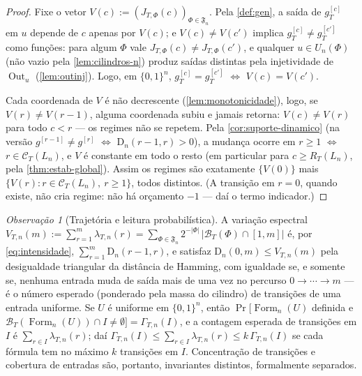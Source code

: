 \documentclass[11pt,a4paper]{article}
\theoremstyle{definition}
\theoremstyle{remark}
\newtheorem*{remark}{Observação}
\newcommand{\Fm}{\operatorname{Form}}
\newcommand{\Out}{\operatorname{Out}}
\begin{document}
\begin{proof}
Fixe o vetor $V(c) := (J_{T,\Phi}(c))_{\Phi \in \mathfrak{F}_n}$. Pela
\cref{def:gen}, a saída de $g_T^{[c]}$ em $u$ depende de $c$ apenas
por $V(c)$; e $V(c) \neq V(c')$ implica $g_T^{[c]} \neq g_T^{[c']}$
como funções: para algum $\Phi$ vale $J_{T,\Phi}(c) \neq
J_{T,\Phi}(c')$, e qualquer $u \in U_n(\Phi)$ (não vazio pela
\cref{lem:cilindros-n}) produz saídas distintas pela injetividade de
$\Out_u$ (\cref{lem:outinj}). Logo, em $\{0,1\}^n$,
$g_T^{[c]} = g_T^{[c']}$ $\iff$ $V(c) = V(c')$.

Cada coordenada de $V$ é não decrescente (\cref{lem:monotonicidade}),
logo, se $V(r) \neq V(r-1)$, alguma coordenada subiu e jamais retorna:
$V(c) \neq V(r)$ para todo $c < r$ --- os regimes não se repetem. Pela
\cref{cor:suporte-dinamico} (na versão $g^{[r-1]} \neq g^{[r]}$
$\iff$ $\mathrm{D}_n(r-1,r) > 0$), a mudança ocorre em $r \geq 1$
$\iff$ $r \in \mathcal{C}_T(L_n)$, e $V$ é constante em todo o resto
(em particular para $c \geq R_T(L_n)$, pela
\cref{thm:estab-global}). Assim os regimes são exatamente $\{V(0)\}$
mais $\{V(r) : r \in \mathcal{C}_T(L_n),\ r \geq 1\}$, todos
distintos. (A transição em $r = 0$, quando existe, não cria regime:
não há orçamento $-1$ --- daí o termo indicador.)
\end{proof}

\begin{remark}[Trajetória e leitura probabilística]\label{rem:trajetoria}
A variação espectral $V_{T,n}(m) := \sum_{r=1}^{m} \lambda_{T,n}(r)
= \sum_{\Phi \in \mathfrak{F}_n} 2^{-|\Phi|}\,
|\mathcal{B}_T(\Phi) \cap [1,m]|$ é, por \eqref{eq:intensidade},
$\sum_{r=1}^{m} \mathrm{D}_n(r-1,r)$, e satisfaz
$\mathrm{D}_n(0,m) \leq V_{T,n}(m)$ pela desigualdade triangular da
distância de Hamming, com igualdade se, e somente se, nenhuma entrada
muda de saída mais de uma vez no percurso $0 \to \cdots \to m$ --- é
o número esperado (ponderado pela massa do cilindro) de transições de
uma entrada uniforme. Se $U$ é uniforme em $\{0,1\}^n$, então
$\Pr[\Fm_n(U)$ definida e $\mathcal{B}_T(\Fm_n(U)) \cap I \neq
\emptyset] = \Gamma_{T,n}(I)$, e a contagem esperada de transições em
$I$ é $\sum_{r \in I} \lambda_{T,n}(r)$; daí
$\Gamma_{T,n}(I) \leq \sum_{r \in I} \lambda_{T,n}(r) \leq
k\,\Gamma_{T,n}(I)$ se cada fórmula tem no máximo $k$ transições em
$I$. Concentração de transições e cobertura de entradas são, portanto,
invariantes distintos, formalmente separados.
\end{remark}
\end{document}
